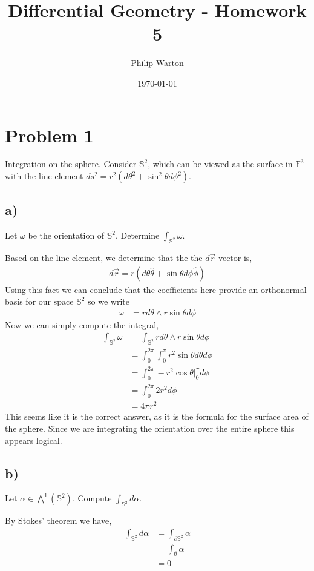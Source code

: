 \documentclass{article}
\theoremstyle{definition}
\begin{document}
\title{Differential Geometry - Homework 5}
\author{Philip Warton}
\date{\today}
\maketitle
\section*{Problem 1}
Integration on the sphere. Consider $\mathbb{S}^2$, which can be viewed as the surface in $\mathbb{E}^3$ with 
the line element $ds^2 = r^2(d\theta^2+\sin^2\theta d\phi^2)$.
\subsection*{a)}
\begin{mdframed}
    Let $\omega$ be the orientation of $\mathbb{S}^2$. Determine $\int_{\mathbb{S}^2}\omega$.    
\end{mdframed}
Based on the line element, we determine that the the $d\vec{r}$ vector is,
\begin{align}
    d\vec{r} = r(d\theta \hat{\theta} + \sin\theta d\phi \hat{\phi})
\end{align}
Using this fact we can conclude that the coefficients here provide an orthonormal basis for
our space $\mathbb{S}^2$ so we write
\begin{align}
    \omega &= rd\theta \wedge r\sin\theta d\phi
\end{align}
Now we can simply compute the integral,
\begin{align}
    \int_{\mathbb{S}^2}\omega & = \int_{\mathbb{S}^2} rd\theta \wedge r\sin\theta d\phi \\
    &=\int_0^{2\pi}\int_0^\pi r^2\sin\theta d\theta d\phi \\
    &=\int_0^{2\pi}-r^2\cos\theta\bigg|_0^\pi d\phi \\
    &=\int_0^{2\pi}2r^2d\phi\\
    &=4\pi r^2
\end{align}
This seems like it is the correct answer, as it is the formula for the surface area of the
sphere. Since we are integrating the orientation over the entire sphere this appears logical.
\subsection*{b)}
\begin{mdframed}
    Let $\alpha \in \bigwedge^1(\mathbb{S}^2)$. Compute $\int_{\mathbb{S}^2}d\alpha$.
\end{mdframed}
By Stokes' theorem we have,
\begin{align}
    \int_{\mathbb{S}^2}d\alpha &= \int_{\partial\mathbb{S}^2}\alpha \\
    &=\int_{\emptyset}\alpha \\
    &= 0
\end{align}
\end{document}
